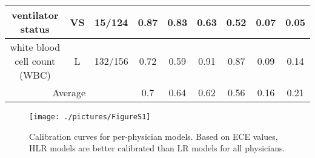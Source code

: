 \begin{scriptsize}
\begin{center}
\begin{longtable}{|ccc|c|c|c|c|c|c|}
\midrule
\multicolumn{1}{|c|}{ventilator status} & \multicolumn{1}{c|}{VS} & 15/124 & 0.87  & 0.83  & 0.63  & 0.52  & 0.07  & 0.05 \\
\midrule
\multicolumn{1}{|c|}{white blood cell count (WBC)} & \multicolumn{1}{c|}{L} & 132/156 & 0.72  & 0.59  & 0.91  & 0.87  & 0.09  & 0.14 \\
\midrule
\multicolumn{3}{|c|}{                                                Average} & 0.7   & 0.64  & 0.62  & 0.56  & 0.16  & 0.21 \\
\bottomrule
\end{longtable}
\end{center}
\end{scriptsize}

\setcounter{figure}{0}
\renewcommand{\thefigure}{A\arabic{figure}}
\begin{figure}[!h]
    \centering
    \texttt{[image: ./pictures/FigureS1]}
    \caption{
    Calibration curves for per-physician models. Based on ECE values, HLR models are better calibrated than LR models for all physicians.
    }\label{fig:s1}
\end{figure}